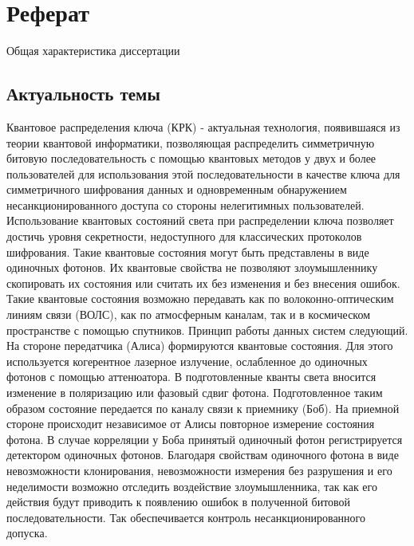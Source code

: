 
\chapter*{Реферат}
\renewcommand{\thefigure}{\arabic{figure}} %
\setcounter{figure}{0}                     %

\begin{center}
    Общая характеристика диссертации
\end{center}

\section*{Актуальность темы}
Квантовое распределения ключа (КРК) - актуальная технология, появившаяся из теории квантовой информатики, позволяющая распределить симметричную битовую последовательность с помощью квантовых методов у двух и более пользователей для использования этой последовательности в качестве ключа для симметричного шифрования данных и одновременным обнаружением несанкционированного доступа со стороны нелегитимных пользователей. Использование квантовых состояний света при распределении ключа позволяет достичь уровня секретности, недоступного для классических протоколов шифрования. Такие квантовые состояния могут быть представлены в виде одиночных фотонов. Их квантовые свойства не позволяют злоумышленнику скопировать их состояния или считать их без изменения и без внесения ошибок. Такие квантовые состояния возможно передавать как по волоконно-оптическим линиям связи (ВОЛС), как по атмосферным каналам, так и в космическом пространстве с помощью спутников. Принцип работы данных систем следующий. На стороне передатчика (Алиса) формируются квантовые состояния. Для этого используется когерентное лазерное излучение, ослабленное до одиночных фотонов с помощью аттенюатора. В подготовленные кванты света вносится изменение в поляризацию или фазовый сдвиг фотона. Подготовленное таким образом состояние передается по каналу связи к приемнику (Боб). На приемной стороне происходит независимое от Алисы повторное измерение состояния фотона. В случае корреляции у Боба принятый одиночный фотон регистрируется детектором одиночных фотонов. Благодаря свойствам одиночного фотона в виде невозможности клонирования, невозможности измерения без разрушения и его неделимости возможно отследить воздействие злоумышленника, так как его действия будут приводить к появлению ошибок в полученной битовой последовательности. Так обеспечивается контроль несанкционированного допуска. 

